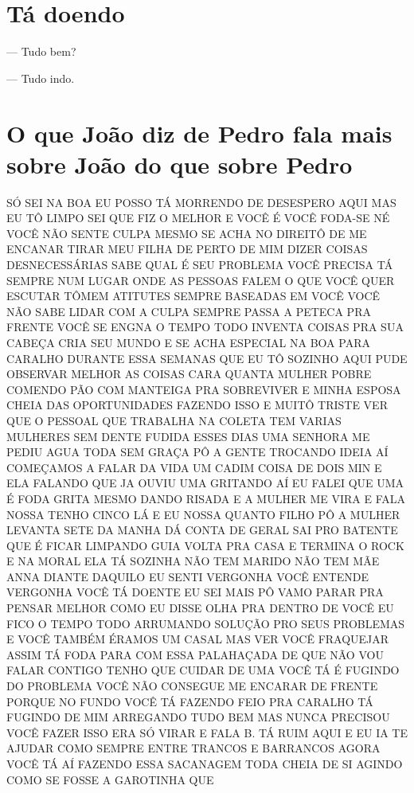 \chapter{Tá doendo}

— Tudo bem?

— Tudo indo.

\chapter{O que João diz de Pedro fala mais sobre João do que sobre Pedro}

SÓ SEI NA BOA EU POSSO TÁ MORRENDO DE DESESPERO AQUI MAS EU TÔ LIMPO SEI
QUE FIZ O MELHOR E VOCÊ É VOCÊ FODA-SE NÉ VOCÊ NÃO SENTE CULPA MESMO SE
ACHA NO DIREITÔ DE ME ENCANAR TIRAR MEU FILHA DE PERTO DE MIM DIZER
COISAS DESNECESSÁRIAS SABE QUAL É SEU PROBLEMA VOCÊ PRECISA TÁ SEMPRE
NUM LUGAR ONDE AS PESSOAS FALEM O QUE VOCÊ QUER ESCUTAR TÔMEM ATITUTES
SEMPRE BASEADAS EM VOCÊ VOCÊ NÃO SABE LIDAR COM A CULPA SEMPRE PASSA A
PETECA PRA FRENTE VOCÊ SE ENGNA O TEMPO TODO INVENTA COISAS PRA SUA
CABEÇA CRIA SEU MUNDO E SE ACHA ESPECIAL NA BOA PARA CARALHO DURANTE
ESSA SEMANAS QUE EU TÔ SOZINHO AQUI PUDE OBSERVAR MELHOR AS COISAS CARA
QUANTA MULHER POBRE COMENDO PÃO COM MANTEIGA PRA SOBREVIVER E MINHA
ESPOSA CHEIA DAS OPORTUNIDADES FAZENDO ISSO E MUITÔ TRISTE VER QUE O
PESSOAL QUE TRABALHA NA COLETA TEM VARIAS MULHERES SEM DENTE FUDIDA
ESSES DIAS UMA SENHORA ME PEDIU AGUA TODA SEM GRAÇA PÔ A GENTE TROCANDO
IDEIA AÍ COMEÇAMOS A FALAR DA VIDA UM CADIM COISA DE DOIS MIN E ELA
FALANDO QUE JA OUVIU UMA GRITANDO AÍ EU FALEI QUE UMA É FODA GRITA MESMO
DANDO RISADA E A MULHER ME VIRA E FALA NOSSA TENHO CINCO LÁ E EU NOSSA
QUANTO FILHO PÔ A MULHER LEVANTA SETE DA MANHA DÁ CONTA DE GERAL SAI PRO
BATENTE QUE É FICAR LIMPANDO GUIA VOLTA PRA CASA E TERMINA O ROCK E NA
MORAL ELA TÁ SOZINHA NÃO TEM MARIDO NÃO TEM MÃE ANNA DIANTE DAQUILO EU
SENTI VERGONHA VOCÊ ENTENDE VERGONHA VOCÊ TÁ DOENTE EU SEI MAIS PÔ VAMO
PARAR PRA PENSAR MELHOR COMO EU DISSE OLHA PRA DENTRO DE VOCÊ EU FICO O
TEMPO TODO ARRUMANDO SOLUÇÃO PRO SEUS PROBLEMAS E VOCÊ TAMBÉM ÉRAMOS UM
CASAL MAS VER VOCÊ FRAQUEJAR ASSIM TÁ FODA PARA COM ESSA PALAHAÇADA DE
QUE NÃO VOU FALAR CONTIGO TENHO QUE CUIDAR DE UMA VOCÊ TÁ É FUGINDO DO
PROBLEMA VOCÊ NÃO CONSEGUE ME ENCARAR DE FRENTE PORQUE NO FUNDO VOCÊ TÁ
FAZENDO FEIO PRA CARALHO TÁ FUGINDO DE MIM ARREGANDO TUDO BEM MAS NUNCA
PRECISOU VOCÊ FAZER ISSO ERA SÓ VIRAR E FALA B. TÁ RUIM AQUI E EU IA TE
AJUDAR COMO SEMPRE ENTRE TRANCOS E BARRANCOS AGORA VOCÊ TÁ AÍ FAZENDO
ESSA SACANAGEM TODA CHEIA DE SI AGINDO COMO SE FOSSE A GAROTINHA QUE

